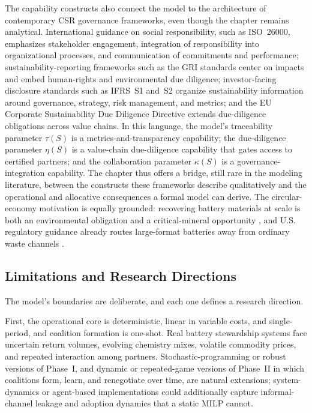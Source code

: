 The capability constructs also connect the model to the architecture of contemporary CSR governance frameworks, even though the chapter remains analytical. International guidance on social responsibility, such as ISO~26000, emphasizes stakeholder engagement, integration of responsibility into organizational processes, and communication of commitments and performance; sustainability-reporting frameworks such as the GRI standards center on impacts and embed human-rights and environmental due diligence; investor-facing disclosure standards such as IFRS~S1 and~S2 organize sustainability information around governance, strategy, risk management, and metrics; and the EU Corporate Sustainability Due Diligence Directive extends due-diligence obligations across value chains. In this language, the model's traceability parameter $\tau(S)$ is a metrics-and-transparency capability; the due-diligence parameter $\eta(S)$ is a value-chain due-diligence capability that gates access to certified partners; and the collaboration parameter $\kappa(S)$ is a governance-integration capability. The chapter thus offers a bridge, still rare in the modeling literature, between the constructs these frameworks describe qualitatively and the operational and allocative consequences a formal model can derive. The circular-economy motivation is equally grounded: recovering battery materials at scale is both an environmental obligation and a critical-mineral opportunity \cite{Harper2019}, and U.S. regulatory guidance already routes large-format batteries away from ordinary waste channels \cite{EPA2026UsedLithiumIon,EPA2026UniversalWaste}.

\subsection{Limitations and Research Directions}

The model's boundaries are deliberate, and each one defines a research direction.

First, the operational core is deterministic, linear in variable costs, and single-period, and coalition formation is one-shot. Real battery stewardship systems face uncertain return volumes, evolving chemistry mixes, volatile commodity prices, and repeated interaction among partners. Stochastic-programming or robust versions of Phase~I, and dynamic or repeated-game versions of Phase~II in which coalitions form, learn, and renegotiate over time, are natural extensions; system-dynamics or agent-based implementations could additionally capture informal-channel leakage and adoption dynamics that a static MILP cannot.

